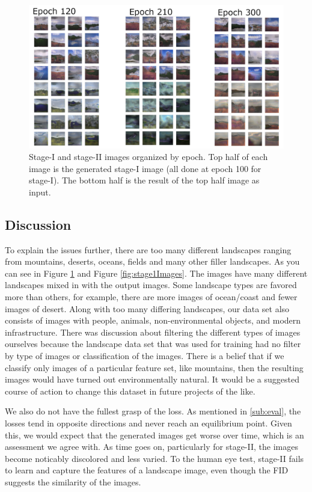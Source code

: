 \documentclass{article}
\begin{document}
	\begin{figure}[h]
	\centering
	\includegraphics[scale=1]{images/StageIandII.png}
	\caption{Stage-I and stage-II images organized by epoch. Top half of each image is the generated stage-I image (all done at epoch 100 for stage-I). The bottom half is the result of the top half image as input.}
	\label{fig:stage2Images}
	\end{figure}

	\subsection{Discussion}	

	To explain the issues further, there are too many different landscapes ranging from mountains, deserts, oceans, fields and many other filler landscapes. As you can see in Figure  \ref{fig:stage2Images} and Figure \ref{fig:stage1Images}. The images have many different landscapes mixed in with the output images. Some landscape types are favored more than others, for example, there are more images of ocean/coast and fewer images of desert. Along with too many differing landscapes, our data set also consists of images with people, animals, non-environmental objects, and modern infrastructure. There was discussion about filtering the different types of images ourselves because the landscape data set that was used for training had no filter by type of images or classification of the images. There is a belief that if we classify only images of a particular feature set, like mountains, then the resulting images would have turned out environmentally natural. It would be a suggested course of action to change this dataset in future projects of the like.

	We also do not have the fullest grasp of the loss. As mentioned in \ref{sub:eval}, the losses tend in opposite directions and never reach an equilibrium point. Given this, we would expect that the generated images get worse over time, which is an assessment we agree with. As time goes on, particularly for stage-II, the images become noticably discolored and less varied. To the human eye test, stage-II fails to learn and capture the features of a landscape image, even though the FID suggests the similarity of the images.
\end{document}
